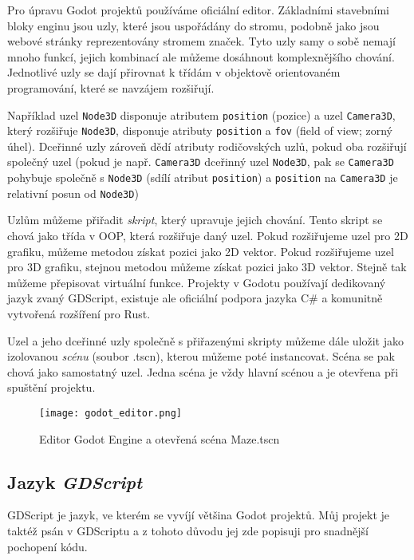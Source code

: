 Pro úpravu Godot projektů používáme oficiální editor. Základními stavebními bloky enginu jsou uzly, které jsou uspořádány do stromu, podobně jako jsou webové stránky reprezentovány stromem značek. Tyto uzly samy o sobě nemají mnoho funkcí, jejich kombinací ale můžeme dosáhnout komplexnějšího chování. Jednotlivé uzly se dají přirovnat k třídám v objektově orientovaném programování, které se navzájem rozšiřují.

Například uzel \texttt{Node3D} disponuje atributem \texttt{position} (pozice) a uzel \texttt{Camera3D}, který rozšiřuje \texttt{Node3D}, disponuje atributy \texttt{position} a \texttt{fov} (field of view; zorný úhel). Dceřinné uzly zároveň dědí atributy rodičovských uzlů, pokud oba rozšiřují společný uzel (pokud je např. \texttt{Camera3D} dceřinný uzel \texttt{Node3D}, pak se \texttt{Camera3D} pohybuje společně s \texttt{Node3D} (sdílí atribut \texttt{position}) a \texttt{position} na \texttt{Camera3D} je relativní posun od \texttt{Node3D})

Uzlům můžeme přiřadit \textit{skript}, který upravuje jejich chování. Tento skript se chová jako třída v OOP, která rozšiřuje daný uzel. Pokud rozšiřujeme uzel pro 2D grafiku, můžeme metodou získat pozici jako 2D vektor. Pokud rozšiřujeme uzel pro 3D grafiku, stejnou metodou můžeme získat pozici jako 3D vektor. Stejně tak můžeme přepisovat virtuální funkce. Projekty v Godotu používají dedikovaný jazyk zvaný GDScript, existuje ale oficiální podpora jazyka C\# a komunitně vytvořená rozšíření pro Rust.

Uzel a jeho dceřinné uzly společně s přiřazenými skripty můžeme dále uložit jako izolovanou \textit{scénu} (soubor .tscn), kterou můžeme poté instancovat. Scéna se pak chová jako samostatný uzel. Jedna scéna je vždy hlavní scénou a je otevřena při spuštění projektu.

\begin{figure}[H]
  \centering
  \texttt{[image: godot\_editor.png]}
  \caption{Editor Godot Engine a otevřená scéna Maze.tscn}
  \label{godot_editor_maze_tscn}
\end{figure}

\subsection{Jazyk \textit{GDScript}}

GDScript je jazyk, ve kterém se vyvíjí většina Godot projektů. Můj projekt je taktéž psán v GDScriptu a z tohoto důvodu jej zde popisuji pro snadnější pochopení kódu.

